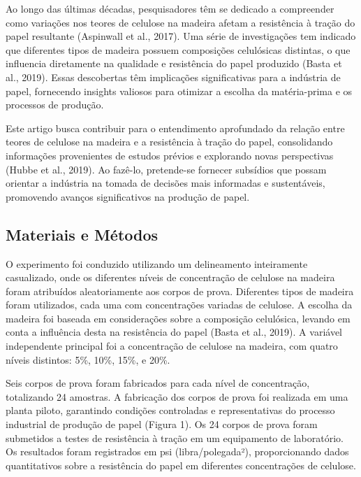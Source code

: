 \documentclass[
]{book}
\begin{document}
Ao longo das últimas décadas, pesquisadores têm se dedicado a compreender como variações nos teores de celulose na madeira afetam a resistência à tração do papel resultante (Aspinwall et al., 2017). Uma série de investigações tem indicado que diferentes tipos de madeira possuem composições celulósicas distintas, o que influencia diretamente na qualidade e resistência do papel produzido (Basta et al., 2019). Essas descobertas têm implicações significativas para a indústria de papel, fornecendo insights valiosos para otimizar a escolha da matéria-prima e os processos de produção.

Este artigo busca contribuir para o entendimento aprofundado da relação entre teores de celulose na madeira e a resistência à tração do papel, consolidando informações provenientes de estudos prévios e explorando novas perspectivas (Hubbe et al., 2019). Ao fazê-lo, pretende-se fornecer subsídios que possam orientar a indústria na tomada de decisões mais informadas e sustentáveis, promovendo avanços significativos na produção de papel.

\subsection{Materiais e Métodos}\label{materiais-e-muxe9todos}

O experimento foi conduzido utilizando um delineamento inteiramente casualizado, onde os diferentes níveis de concentração de celulose na madeira foram atribuídos aleatoriamente aos corpos de prova. Diferentes tipos de madeira foram utilizados, cada uma com concentrações variadas de celulose. A escolha da madeira foi baseada em considerações sobre a composição celulósica, levando em conta a influência desta na resistência do papel (Basta et al., 2019). A variável independente principal foi a concentração de celulose na madeira, com quatro níveis distintos: 5\%, 10\%, 15\%, e 20\%.

Seis corpos de prova foram fabricados para cada nível de concentração, totalizando 24 amostras. A fabricação dos corpos de prova foi realizada em uma planta piloto, garantindo condições controladas e representativas do processo industrial de produção de papel (Figura 1). Os 24 corpos de prova foram submetidos a testes de resistência à tração em um equipamento de laboratório. Os resultados foram registrados em psi (libra/polegada²), proporcionando dados quantitativos sobre a resistência do papel em diferentes concentrações de celulose.

  
\end{document}
